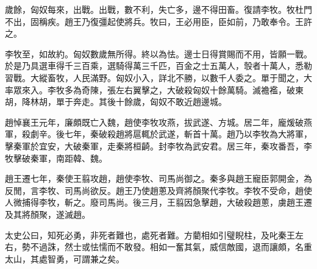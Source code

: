 歲餘，匈奴每來，出戰。出戰，數不利，失亡多，邊不得田畜。復請李牧。牧杜門不出，固稱疾。趙王乃復彊起使將兵。牧曰，王必用臣，臣如前，乃敢奉令。王許之。

李牧至，如故約。匈奴數歲無所得。終以為怯。邊士日得賞賜而不用，皆願一戰。於是乃具選車得千三百乘，選騎得萬三千匹，百金之士五萬人，彀者十萬人，悉勒習戰。大縱畜牧，人民滿野。匈奴小入，詳北不勝，以數千人委之。單于聞之，大率眾來入。李牧多為奇陳，張左右翼擊之，大破殺匈奴十餘萬騎。滅襜襤，破東胡，降林胡，單于奔走。其後十餘歲，匈奴不敢近趙邊城。

趙悼襄王元年，廉頗既亡入魏，趙使李牧攻燕，拔武遂、方城。居二年，龐煖破燕軍，殺劇辛。後七年，秦破殺趙將扈輒於武遂，斬首十萬。趙乃以李牧為大將軍，擊秦軍於宜安，大破秦軍，走秦將桓齮。封李牧為武安君。居三年，秦攻番吾，李牧擊破秦軍，南距韓、魏。

趙王遷七年，秦使王翦攻趙，趙使李牧、司馬尚御之。秦多與趙王寵臣郭開金，為反閒，言李牧、司馬尚欲反。趙王乃使趙蔥及齊將顏聚代李牧。李牧不受命，趙使人微捕得李牧，斬之。廢司馬尚。後三月，王翦因急擊趙，大破殺趙蔥，虜趙王遷及其將顏聚，遂滅趙。

太史公曰，知死必勇，非死者難也，處死者難。方藺相如引璧睨柱，及叱秦王左右，勢不過誅，然士或怯懦而不敢發。相如一奮其氣，威信敵國，退而讓頗，名重太山，其處智勇，可謂兼之矣。